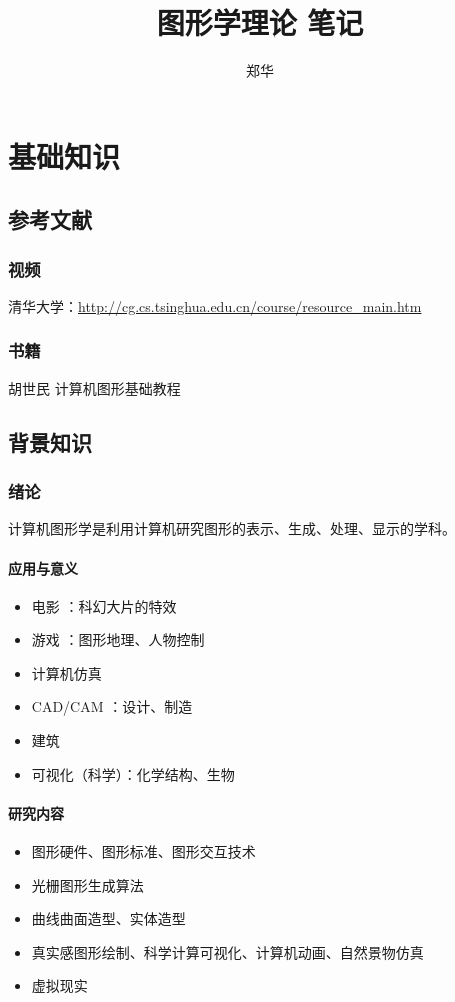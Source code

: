 \documentclass[UTF8,a4paper,12pt]{ctexbook}
\author{\kaishu 郑华}
\title{\heiti 图形学理论 笔记}
\begin{document}
 	\maketitle
 	\tableofcontents
 	
 
 
\part{基础知识}
\chapter{参考文献}
	\section{视频} 清华大学：\url{http://cg.cs.tsinghua.edu.cn/course/resource_main.htm}
	
	\section{书籍} 胡世民 计算机图形基础教程
	
	
\chapter{背景知识}
	\section{绪论}
		计算机图形学是利用计算机研究图形的表示、生成、处理、显示的学科。
		
		\subsection{应用与意义}
			\begin{itemize}
				\item 电影 ：科幻大片的特效
				\item 游戏 ：图形地理、人物控制
				\item 计算机仿真
				\item CAD/CAM ：设计、制造
	 			\item 建筑
				\item 可视化（科学）：化学结构、生物
			\end{itemize}	
	
		\subsection{研究内容}
			\begin{itemize}
				\item 图形硬件、图形标准、图形交互技术
				\item 光栅图形生成算法
				\item 曲线曲面造型、实体造型
				\item 真实感图形绘制、科学计算可视化、计算机动画、自然景物仿真
				\item 虚拟现实
			\end{itemize}
			
\end{document}
